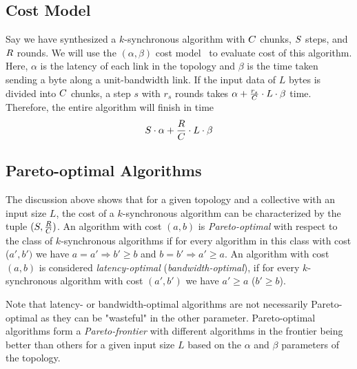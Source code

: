 \subsection{Cost Model}
\label{sec:costmodel}
Say we have synthesized a $k$-synchronous algorithm with $C$
chunks, $S$ steps, and $R$ rounds. We will use the
$(\alpha, \beta)$ cost model~\cite{hockney1994communication} to
evaluate cost of this algorithm. Here, $\alpha$ is the latency of each
link in the topology and $\beta$ is the time taken sending a byte
along a unit-bandwidth link. If the input data of $L$ bytes is divided
into $C$ chunks, a step $s$ with $r_s$ rounds takes $\alpha +
\frac{r_s}{C}\cdot L \cdot \beta$ time. Therefore, the entire
algorithm will finish in time
$$ S \cdot \alpha + \frac{R}{C} \cdot L \cdot \beta $$

\subsection{Pareto-optimal Algorithms}
\label{sec:pareto:optimal}
The discussion above shows that for a given topology and a collective
with an input size $L$, the cost of a $k$-synchronous algorithm can be
characterized by the tuple $(S, \frac{R}{C})$. An
algorithm with cost $(a,b)$ is {\em Pareto-optimal} with respect to
the class of $k$-synchronous algorithms if for every algorithm in this
class with cost  ($a', b')$ we have $a = a' \Rightarrow b' \geq b$ and
$b = b' \Rightarrow a' \geq a$. An algorithm with cost $(a,b)$ is
considered {\em latency-optimal} ({\em bandwidth-optimal}), if for
every $k$-synchronous algorithm with cost $(a',b')$ we have $a' \geq
a$ ($b' \geq b$).

Note that latency- or bandwidth-optimal algorithms are not necessarily
Pareto-optimal as they can be "wasteful" in the other parameter.
Pareto-optimal algorithms form a {\em Pareto-frontier} with different
algorithms in the frontier being better than others for a given input
size $L$ based on the $\alpha$ and $\beta$ parameters of the topology.

